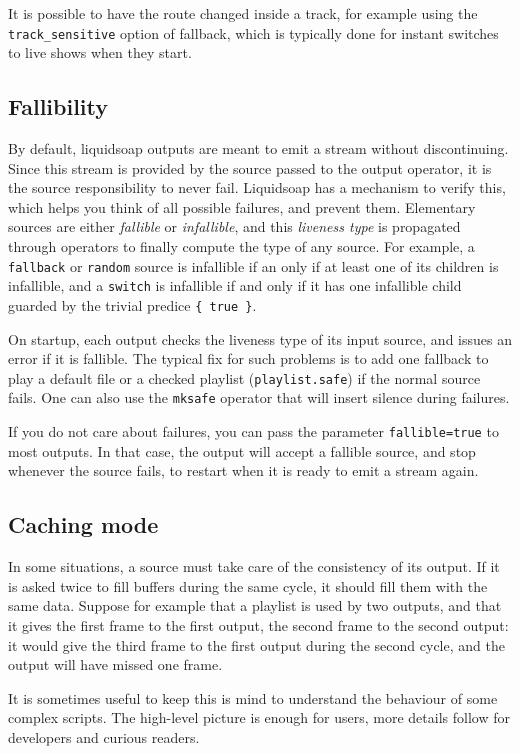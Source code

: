 It is possible to have the route changed inside a track,
for example using the \verb+track_sensitive+ option of fallback,
which is typically done for instant switches to live shows when they start.

\subsection{Fallibility}
By default, liquidsoap outputs are meant to emit a stream without
discontinuing. Since this stream is provided by the source passed to the
output operator, it is the source responsibility to never fail.
Liquidsoap has a mechanism to verify this, which helps you think of
all possible failures, and prevent them.
Elementary sources are either \emph{fallible} or \emph{infallible}, and this
\emph{liveness type} is propagated through operators to finally
compute the type of any source.
For example,
a \verb+fallback+ or \verb+random+ source is infallible
if an only if at least one of its children is infallible,
and a \verb+switch+ is infallible if and only if it has one infallible
child guarded by the trivial predice \verb+{ true }+.

On startup, each output checks the liveness type of its input source,
and issues an error if it is fallible. The typical fix for such problems
is to add one fallback to play a default file or a checked playlist
(\verb+playlist.safe+) if the normal source fails.
One can also use the \verb+mksafe+ operator that will insert silence
during failures.

If you do not care about failures, you can pass the parameter 
\verb+fallible=true+ to most outputs. In that case, the output
will accept a fallible source, and stop whenever the source fails,
to restart when it is ready to emit a stream again.

\subsection{Caching mode}
In some situations, a source must take care of the consistency of its 
output. If it is asked twice to fill buffers during the same cycle, it 
should fill them with the same data. Suppose for example that a playlist is 
used by two outputs, and that it gives the first frame to the first 
output, the second frame to the second output: it would give the third frame 
to the first output during the second cycle,
and the output will have missed one frame.

It is sometimes useful to keep this is mind to understand the behaviour
of some complex scripts. The high-level picture is enough for users,
more details follow for developers and curious readers.

